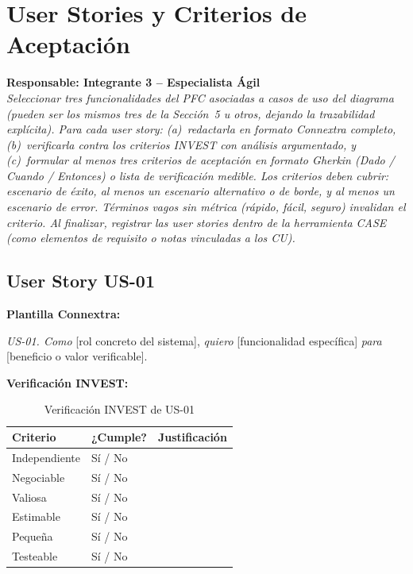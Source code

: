 \documentclass[journal,onecolumn]{IEEEtran}
\newcommand{\guia}[2]{%
  \begin{mdframed}[style=guia]
    \noindent\textbf{Responsable: #1}\\[2pt]
    \textit{#2}
  \end{mdframed}
}
\begin{document}
\newpage

\section{User Stories y Criterios de Aceptación}

\guia{Integrante 3 -- Especialista Ágil}{%
Seleccionar tres funcionalidades del PFC asociadas a casos de uso del diagrama
(pueden ser los mismos tres de la Sección~5 u otros, dejando la trazabilidad
explícita). Para cada user story: (a)~redactarla en formato Connextra completo,
(b)~verificarla contra los criterios INVEST con análisis argumentado, y
(c)~formular al menos tres criterios de aceptación en formato Gherkin
(\textit{Dado / Cuando / Entonces}) o lista de verificación medible.
Los criterios deben cubrir: escenario de éxito, al menos un escenario
alternativo o de borde, y al menos un escenario de error.
Términos vagos sin métrica (\textit{rápido, fácil, seguro}) invalidan el criterio.
Al finalizar, registrar las user stories dentro de la herramienta CASE
(como elementos de requisito o notas vinculadas a los CU).}

\subsection{User Story US-01}

\textbf{Plantilla Connextra:}

\begin{mdframed}[style=guia]
\textit{US-01. Como} [rol concreto del sistema], \textit{quiero} [funcionalidad específica]
\textit{para} [beneficio o valor verificable].
\end{mdframed}

\textbf{Verificación INVEST:}

\begin{table}[H]
\caption{Verificación INVEST de US-01}
\label{tab:invest01}
\begin{tabularx}{\textwidth}{|l|l|X|}
\hline
\textbf{Criterio} & \textbf{¿Cumple?} & \textbf{Justificación} \\
\hline
Independiente  & Sí / No & \\
\hline
Negociable     & Sí / No & \\
\hline
Valiosa        & Sí / No & \\
\hline
Estimable      & Sí / No & \\
\hline
Pequeña        & Sí / No & \\
\hline
Testeable      & Sí / No & \\
\hline
\end{tabularx}
\end{table}
\end{document}
